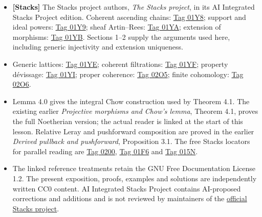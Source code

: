 \documentclass[11pt]{article}
\providecommand{\tightlist}{\setlength{\itemsep}{0pt}\setlength{\parskip}{0pt}}
\begin{document}
\begin{itemize}
\tightlist
\item
  \textbf{{[}Stacks{]}} The Stacks project authors, \emph{The Stacks
  project}, in its AI Integrated Stacks Project edition. Coherent
  ascending chains:
  \href{https://kokunoyumeto.github.io/stacks-zh-hans-cn/en/coherent.html\#coherent-lemma-acc-coherent}{Tag
  01Y8}; support and ideal powers:
  \href{https://kokunoyumeto.github.io/stacks-zh-hans-cn/en/coherent.html\#coherent-lemma-power-ideal-kills-sheaf}{Tag
  01Y9}; sheaf Artin--Rees:
  \href{https://kokunoyumeto.github.io/stacks-zh-hans-cn/en/coherent.html\#coherent-lemma-Artin-Rees}{Tag
  01YA}; extension of morphisms:
  \href{https://kokunoyumeto.github.io/stacks-zh-hans-cn/en/coherent.html\#coherent-lemma-homs-over-open}{Tag
  01YB}. Sections 1--2 supply the arguments used here, including generic
  injectivity and extension uniqueness.
\item
  Generic lattices:
  \href{https://kokunoyumeto.github.io/stacks-zh-hans-cn/en/coherent.html\#coherent-lemma-prepare-filter-irreducible}{Tag
  01YE}; coherent filtrations:
  \href{https://kokunoyumeto.github.io/stacks-zh-hans-cn/en/coherent.html\#coherent-lemma-coherent-filter}{Tag
  01YF}; property dévissage:
  \href{https://kokunoyumeto.github.io/stacks-zh-hans-cn/en/coherent.html\#coherent-lemma-property}{Tag
  01YI}; proper coherence:
  \href{https://kokunoyumeto.github.io/stacks-zh-hans-cn/en/coherent.html\#coherent-proposition-proper-pushforward-coherent}{Tag
  02O5}; finite cohomology:
  \href{https://kokunoyumeto.github.io/stacks-zh-hans-cn/en/coherent.html\#coherent-lemma-proper-over-affine-cohomology-finite}{Tag
  02O6}.
\item
  Lemma 4.0 gives the integral Chow construction used by Theorem 4.1.
  The existing earlier \emph{Projective morphisms and Chow's lemma},
  Theorem 4.1, proves the full Noetherian version; the actual reader is
  linked at the start of this lesson. Relative Leray and pushforward
  composition are proved in the earlier \emph{Derived pullback and
  pushforward}, Proposition 3.1. The free Stacks locators for parallel
  reading are
  \href{https://kokunoyumeto.github.io/stacks-zh-hans-cn/en/coherent.html\#coherent-lemma-chow-Noetherian}{Tag
  0200},
  \href{https://kokunoyumeto.github.io/stacks-zh-hans-cn/en/cohomology.html\#cohomology-lemma-relative-Leray}{Tag
  01F6} and
  \href{https://kokunoyumeto.github.io/stacks-zh-hans-cn/en/derived.html\#derived-lemma-grothendieck-spectral-sequence}{Tag
  015N}.
\item
  The linked reference treatments retain the GNU Free Documentation
  License 1.2. The present exposition, proofs, examples and solutions
  are independently written CC0 content. AI Integrated Stacks Project
  contains AI-proposed corrections and additions and is not reviewed by
  maintainers of the \href{https://stacks.math.columbia.edu/}{official
  Stacks project}.
\end{itemize}
\end{document}
